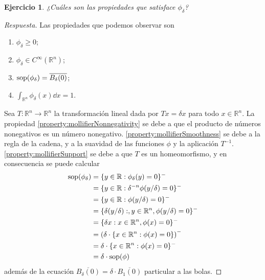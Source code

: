 \documentclass{article}
\newcommand{\realNumbers}{\mathbb{R}}
\newtheorem{exercise}{Ejercicio}
\DeclareMathOperator{\support}{\textnormal{sop}}
\theoremstyle{remark}
\begin{document}
\begin{exercise}
  \label{exercise:deltaMollifierProperties}
  ¿Cuáles son las propiedades que satisface \(\phi_{\delta}\)?
\end{exercise}
\begin{proof}[Respuesta]
  Las propiedades que podemos observar son
  \begin{enumerate}[label=\alph*)]
    \item 
      \label{property:mollifierNonnegativity}
      \(\phi_{\delta} \geq 0\);
    \item 
      \label{property:mollifierSmoothness}
      \(\phi_{\delta} \in C^{\infty}(\realNumbers^n)\);
    \item 
      \label{property:mollifierSupport}
      \(\support(\phi_{\delta}) = \overline{B_{\delta}(0)}\);
    \item 
      \label{property:mollifierIntegral}
      \(\int_{\realNumbers^n} \phi_{\delta}(x) \dd x = 1\).
  \end{enumerate}
  Sea \(T : \realNumbers^n \rightarrow \realNumbers^n\) la transformación lineal dada por \(T x = \delta x\) para todo \(x \in \realNumbers^n\).
  La propiedad
  \ref{property:mollifierNonnegativity}
  se debe a que el producto de números nonegativos es un número nonegativo.
  \ref{property:mollifierSmoothness}
  se debe a la regla de la cadena, y a la suavidad de las funciones \(\phi\) y la aplicación \(T^{- 1}\).
  \ref{property:mollifierSupport}
  se debe a que \(T\) es un homeomorfismo, y en consecuencia se puede calcular
  \begin{align}
    \support(\phi_{\delta})
    &=
    \{y \in \realNumbers : \phi_{\delta}(y) = 0\}^-
    \\
    &=
    \{y \in \realNumbers : \delta^{- n} \phi(y / \delta) = 0\}^-
    \\
    &=
    \{y \in \realNumbers : \phi(y / \delta) = 0\}^-
    \\
    &=
    \{\delta (y / \delta) :, y \in \realNumbers^n, \phi(y / \delta) = 0\}^-
    \\
    &=
    \{\delta x : x \in \realNumbers^n, \phi(x) = 0\}^-
    \\
    &=
    \left(
      \delta \cdot
      \{x \in \realNumbers^n: \phi(x) = 0\}
    \right)^-
    \\
    &=
    \delta \cdot 
    \{x \in \realNumbers^n: \phi(x) = 0\}^-
    \\
    &=
    \delta \cdot 
    \support(\phi)
  \end{align}
  además de la ecuación \(\overline{B_{\delta}(0)} = \delta \cdot \overline{B_1(0)}\) particular a las bolas.

\end{proof}
\end{document}
